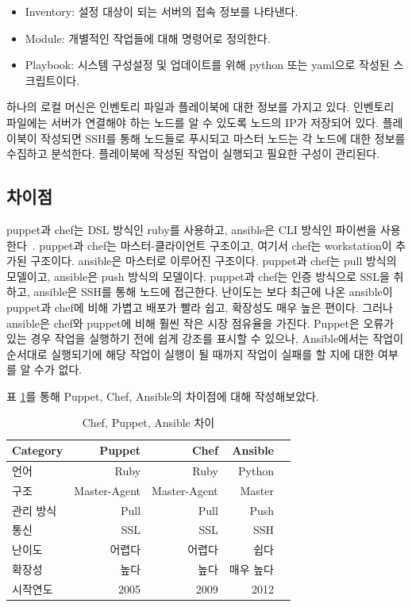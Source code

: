 \documentclass{pnu-survey}
\begin{document}
\begin{itemize}[itemsep=0pt,parsep=0pt]
    \item Inventory: 설정 대상이 되는 서버의 접속 정보를 나타낸다.
    \item Module: 개별적인 작업들에 대해 명령어로 정의한다. 
    \item Playbook: 시스템 구성설정 및 업데이트를 위해 python 또는 yaml으로 작성된 스크립트이다.
\end{itemize}

하나의 로컬 머신은 인벤토리 파일과 플레이북에 대한 정보를 가지고 있다.
인벤토리 파일에는 서버가 연결해야 하는 노드를 알 수 있도록 노드의 IP가 저장되어 있다.
플레이북이 작성되면 SSH를 통해 노드들로 푸시되고 마스터 노드는 각 노드에 대한 정보를 수집하고 분석한다.
플레이북에 작성된 작업이 실행되고 필요한 구성이 관리된다.

\subsection{차이점}

puppet과 chef는 DSL 방식인 ruby를 사용하고, ansible은 CLI 방식인 파이썬을 사용한다~\cite{difference}. puppet과 chef는 마스터-클라이언트 구조이고, 여기서 chef는 workstation이 추가된 구조이다. ansible은 마스터로 이루어진 구조이다. puppet과 chef는 pull 방식의 모델이고, ansible은 push 방식의 모델이다. puppet과 chef는 인증 방식으로 SSL을 취하고, ansible은 SSH를 통해 노드에 접근한다. 난이도는 보다 최근에 나온 ansible이 puppet과 chef에 비해 가볍고 배포가 빨라 쉽고, 확장성도 매우 높은 편이다. 그러나 ansible은 chef와 puppet에 비해 훨씬 작은 시장 점유율을 가진다. Puppet은 오류가 있는 경우 작업을 실행하기 전에 쉽게 강조를 표시할 수 있으나, Ansible에서는 작업이 순서대로 실행되기에 해당 작업이 실행이 될 때까지 작업이 실패를 할 지에 대한 여부를 알 수가 없다. 

표 \ref{tab:difference}를 통해 Puppet, Chef, Ansible의 차이점에 대해 작성해보았다. 
\begin{table}[!ht]
\centering
\setlength{\belowcaptionskip}{5pt}
\caption{Chef, Puppet, Ansible 차이}
\label{tab:difference}
\begin{tabular}{@{}lrrrr@{}} 
\toprule
{\bfseries Category} & {Puppet} & {Chef} & {Ansible} \\
\midrule
언어			    &Ruby	            &Ruby		            &Python\\
구조		        &Master-Agent	    &Master-Agent 		    &Master \\
관리 방식		    &Pull	            &Pull		            &Push \\
통신 			&SSL                &SSL                    &SSH \\
난이도			&어렵다		        &어렵다		            &쉽다 \\
확장성			&높다			    &높다		            &매우 높다 \\
시작연도			&2005			    &2009		            &2012 \\
\bottomrule
\end{tabular}
\end{table}
\end{document}
